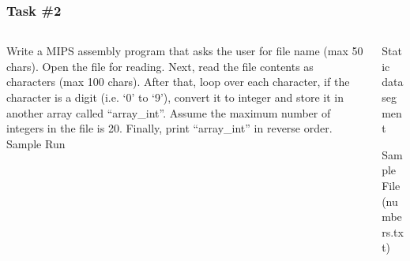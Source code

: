 \documentclass[
	10pt, %
	hmargin=1cm,vmargin=0cm,head=0.5cm,headsep=0pt,foot=0.5cm,margin=2cm
]{beamer}
\begin{document}
\begin{frame}
	\frametitle{Task \#2}
	\begin{columns}[c]
		\begin{column}{0.6\textwidth}
			\justifying
			Write a MIPS assembly program that asks the user for file name (max 50 chars). Open the file for reading. Next, read the file contents as characters (max 100 chars). After that, loop over each character, if the character is a digit (i.e. `0' to `9'), convert it to integer and store it in another array called ``array\_int''. Assume the maximum number of integers in the file is 20. Finally, print ``array\_int'' in reverse order. \\
			
			
			\vspace{0.3cm}
			\centering
			Sample Run 

		\end{column}
		\begin{column}{0.4\textwidth}
		\centering
			Static data segment 

			\vspace{0.5cm}
			
			Sample File (numbers.txt)

			
			
		\end{column}
	\end{columns}
\end{frame}

\end{document}
